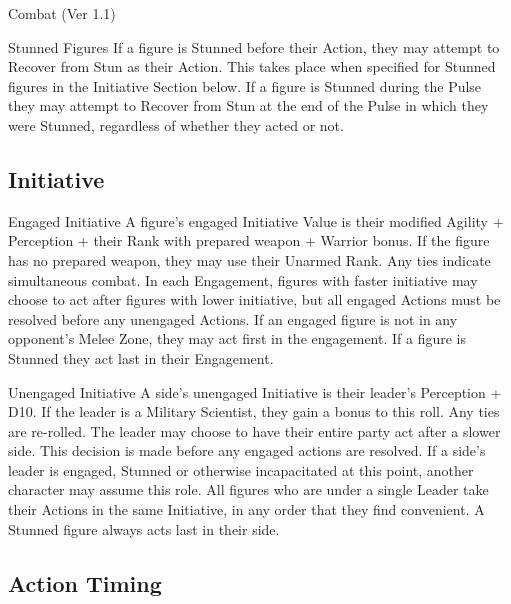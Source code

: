 \begin{Chapter}{Combat (Ver 1.1)}
\begin{Description}
\item[Stunned Figures] If a figure is Stunned before their Action,
  they may attempt to Recover from Stun as their Action.  This takes
  place when specified for Stunned figures in the Initiative Section
  below. If a figure is Stunned during the Pulse they may attempt to
  Recover from Stun at the end of the Pulse in which they were
  Stunned, regardless of whether they acted or not.

\end{Description}

\subsection{Initiative}

\begin{Description}
  
\item[Engaged Initiative] A figure’s engaged Initiative Value is their
  modified Agility + Perception + their Rank with prepared weapon +
  Warrior bonus.  If the figure has no prepared weapon, they may use
  their Unarmed Rank.  Any ties indicate simultaneous combat.  In each
  Engagement, figures with faster initiative may choose to act after
  figures with lower initiative, but all engaged Actions must be
  resolved before any unengaged Actions.  If an engaged figure is not
  in any opponent’s Melee Zone, they may act first in the engagement.
  If a figure is Stunned they act last in their Engagement.

\item[Unengaged Initiative] A side’s unengaged Initiative is their
  leader’s Perception + D10. If the leader is a Military Scientist,
  they gain a bonus to this roll. Any ties are re-rolled. The leader
  may choose to have their entire party act after a slower side.  This
  decision is made before any engaged actions are resolved. If a
  side’s leader is engaged, Stunned or otherwise incapacitated at this
  point, another character may assume this role. All figures who are
  under a single Leader take their Actions in the same Initiative, in
  any order that they find convenient.  A Stunned figure always acts
  last in their side.

\end{Description}

\subsection{Action Timing}


\end{Chapter}
